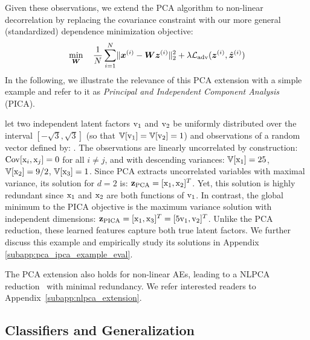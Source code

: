 Given these observations, we extend the PCA algorithm to non-linear decorrelation by replacing the covariance constraint with our more general (standardized) dependence minimization objective: 
\begin{multline} \label{eq:extended_pca_loss}
    \min_{\mW} \quad \frac{1}{N} \sum_{i=1}^N \lVert \vx^{(i)} - \mW \vz^{(i)} \rVert_2^2 
    + \lambda \mathcal{L}_{\mathrm{adv}}(\vz^{(i)}, \hat{\vz}^{(i)}) %
\end{multline} %
In the following, we illustrate the relevance of this PCA extension with a simple example and refer to it as \textit{Principal and Independent Component Analysis} (PICA). 
\begin{example} \label{ex:pca_vs_pica}
    let two independent latent factors ${\textnormal{v}}_1$ and ${\textnormal{v}}_2$ be uniformly distributed over the interval $[-\sqrt{3},\sqrt{3}]$ (so that $\mathbb{V}[{\textnormal{v}}_1] = \mathbb{V}[{\textnormal{v}}_2] = 1$) and observations of a random vector defined by: 
    . 
    The observations are linearly uncorrelated by construction: $\mathrm{Cov}[{\textnormal{x}}_i,{\textnormal{x}}_j] = 0$ for all $i \neq j$, and with descending variances: $\mathbb{V}[{\textnormal{x}}_1] = 25$, $\mathbb{V}[{\textnormal{x}}_2] = 9/2$, $\mathbb{V}[{\textnormal{x}}_3] = 1$. 
    Since PCA extracts uncorrelated variables with maximal variance, its solution for $d=2$ is: ${\mathbf{z}}_{\mathrm{PCA}} = [{\textnormal{x}}_1,{\textnormal{x}}_2]^T$. Yet, this solution is highly redundant since ${\textnormal{x}}_1$ and ${\textnormal{x}}_2$ are both functions of ${\textnormal{v}}_1$. 
    In contrast, the global minimum to the PICA objective is the maximum variance solution with independent dimensions: ${\mathbf{z}}_{\mathrm{PICA}} = [{\textnormal{x}}_1,{\textnormal{x}}_3]^T = [5{\textnormal{v}}_1,{\textnormal{v}}_2]^T$. 
    Unlike the PCA reduction, these learned features capture both true latent factors. 
    We further discuss this example and empirically study its solutions in Appendix \ref{subapp:pca_ipca_example_eval}.
\end{example}

The PCA extension also holds for non-linear AEs, leading to a NLPCA reduction~\citep{kramer1991autoencoder_nlpca} with minimal redundancy. We refer interested readers to Appendix~\ref{subapp:nlpca_extension}.


\subsection{Classifiers and Generalization} \label{subsec:classif_application}

